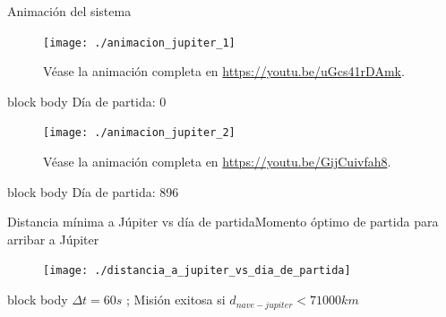 \documentclass{beamer}
\begin{document}
            \begin{frame}{Animación del sistema}{}
                \vspace*{-0.3cm}
                \begin{minipage}[t]{0.49\textwidth}
                    \begin{figure}[H!]
                        \texttt{[image: ./animacion\_jupiter\_1]}
                        \caption*{Véase la animación completa en \url{https://youtu.be/uGcs41rDAmk}.}
                        \label{fig:jupiter_1}
                    \end{figure}
                    \vspace*{-0.5cm}
                    \begin{beamercolorbox}[sep=5pt,center]{block body}
                        \centering
                        \small{Día de partida: 0}
                    \end{beamercolorbox}
                \end{minipage}
                \hfill
                \begin{minipage}[t]{0.49\textwidth}
                    \begin{figure}[H!]
                        \texttt{[image: ./animacion\_jupiter\_2]}
                        \caption*{Véase la animación completa en \url{https://youtu.be/GijCuivfah8}.}
                        \label{fig:jupiter_2}
                    \end{figure}
                    \vspace*{-0.5cm}
                    \begin{beamercolorbox}[sep=5pt,center]{block body}
                        \centering
                        \small{Día de partida: 896}
                    \end{beamercolorbox}
                \end{minipage}
            \end{frame}

            \begin{frame}{Distancia mínima a Júpiter vs día de partida}{Momento óptimo de partida para arribar a Júpiter}
                \begin{figure}[H!]
                    \texttt{[image: ./distancia\_a\_jupiter\_vs\_dia\_de\_partida]}
                    \label{fig:jupiter_3}
                \end{figure}
                \begin{beamercolorbox}[sep=5pt,center]{block body}
                    \centering
                    \small{$\Delta t = 60s$ ; Misión exitosa si $d_{nave-jupiter} < 71000 km$}
                \end{beamercolorbox}
            \end{frame}
\end{document}
